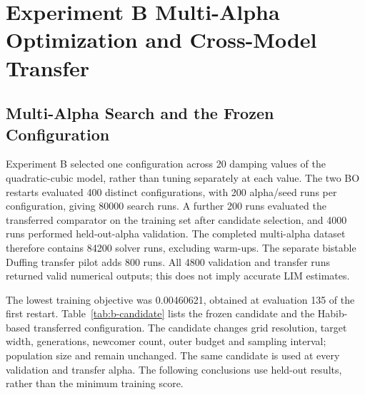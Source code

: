\section{Experiment B Multi-Alpha Optimization and Cross-Model Transfer}
\label{sec:experiment-b}

\subsection{Multi-Alpha Search and the Frozen Configuration}
\begin{bluerevision}
Experiment B selected one configuration across 20 damping values of the quadratic-cubic model, rather than tuning separately at each value. The two BO restarts evaluated 400 distinct configurations, with 200 alpha/seed runs per configuration, giving 80000 search runs. A further 200 runs evaluated the transferred comparator on the training set after candidate selection, and 4000 runs performed held-out-alpha validation. The completed multi-alpha dataset therefore contains 84200 solver runs, excluding warm-ups. The separate bistable Duffing transfer pilot adds 800 runs. All 4800 validation and transfer runs returned valid numerical outputs; this does not imply accurate LIM estimates.

The lowest training objective was 0.00460621, obtained at evaluation 135 of the first restart. Table~\ref{tab:b-candidate} lists the frozen candidate and the Habib-based transferred configuration. The candidate changes grid resolution, target width, generations, newcomer count, outer budget and sampling interval; population size and  remain unchanged. The same candidate is used at every validation and transfer alpha. The following conclusions use held-out results, rather than the minimum training score.
\end{bluerevision}



